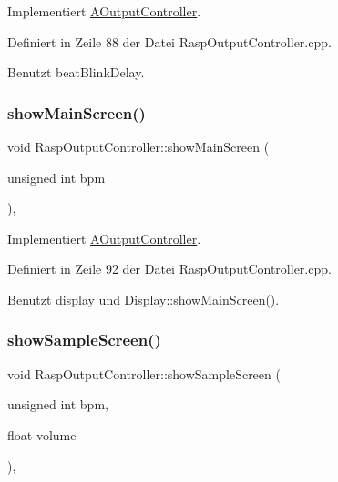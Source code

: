 Implementiert \hyperlink{class_a_output_controller_ac685432fc57d2441ecb548386554d2c9}{A\+Output\+Controller}.



Definiert in Zeile 88 der Datei Rasp\+Output\+Controller.\+cpp.



Benutzt beat\+Blink\+Delay.

\mbox{\label{class_rasp_output_controller_ad195a3d664b7c7e5680cd8949203c1fc}} 
\subsubsection{\texorpdfstring{show\+Main\+Screen()}{showMainScreen()}}
{\footnotesize\ttfamily void Rasp\+Output\+Controller\+::show\+Main\+Screen (\begin{DoxyParamCaption}\item[{unsigned int}]{bpm }\end{DoxyParamCaption})\hspace{0.3cm}{\ttfamily [override]}, {\ttfamily [virtual]}}



Implementiert \hyperlink{class_a_output_controller_ace7df9de71110b3615156b9bd06a9349}{A\+Output\+Controller}.



Definiert in Zeile 92 der Datei Rasp\+Output\+Controller.\+cpp.



Benutzt display und Display\+::show\+Main\+Screen().

\mbox{\label{class_rasp_output_controller_a613d3a1d1ceb31875be95e4a4b733fba}} 
\subsubsection{\texorpdfstring{show\+Sample\+Screen()}{showSampleScreen()}}
{\footnotesize\ttfamily void Rasp\+Output\+Controller\+::show\+Sample\+Screen (\begin{DoxyParamCaption}\item[{unsigned int}]{bpm,  }\item[{float}]{volume }\end{DoxyParamCaption})\hspace{0.3cm}{\ttfamily [override]}, {\ttfamily [virtual]}}



